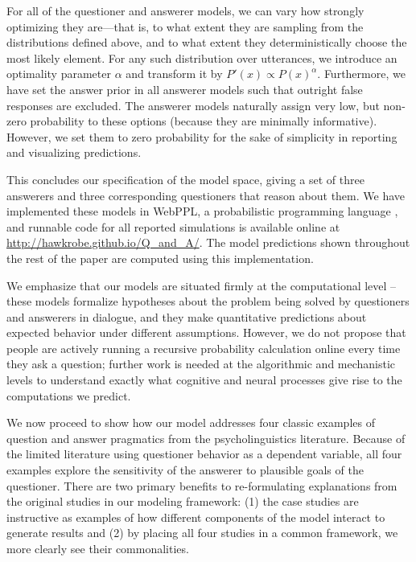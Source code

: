 \documentclass[12pt, floatsintext, jou]{apa6}
\begin{document}
For all of the questioner and answerer models, we can vary how strongly optimizing they are---that is, to what extent they are sampling from the distributions defined above, and to what extent they deterministically choose the most likely element. For any such distribution over utterances, we introduce an optimality parameter $\alpha$ and transform it by $ P'(x) \propto P(x)^{\alpha} $. Furthermore, we have set the answer prior in all answerer models such that outright false responses are excluded. The answerer models naturally assign very low, but non-zero probability to these options (because they are minimally informative). However, we set them to zero probability for the sake of simplicity in reporting and visualizing predictions.
%

This concludes our specification of the model space, giving a set of three answerers and three corresponding questioners that reason about them. We have implemented these models in WebPPL, a probabilistic programming language \cite{GoodmanStuhlmuller14_DIPPL}, and runnable code for all reported simulations is available online at \url{http://hawkrobe.github.io/Q\_and\_A/}. The model predictions shown throughout the rest of the paper are computed using this implementation. 

We emphasize that our models are situated firmly at the computational level \cite{Marr10_Vision} -- these models formalize hypotheses about the problem being solved by questioners and answerers in dialogue, and they make quantitative predictions about expected behavior under different assumptions. However, we do not propose that people are actively running a recursive probability calculation online every time they ask a question; further work is needed at the algorithmic and mechanistic levels to understand exactly what cognitive and neural processes give rise to the computations we predict. 

We now proceed to show how our model addresses four classic examples of question and answer pragmatics from the psycholinguistics literature. Because of the limited literature using questioner behavior as a dependent variable, all four examples explore the sensitivity of the answerer to plausible goals of the questioner. There are two primary benefits to re-formulating explanations from the original studies in our modeling framework: (1) the case studies are instructive as examples of how different components of the model interact to generate results and (2) by placing all four studies in a common framework, we more clearly see their commonalities.
\end{document}
